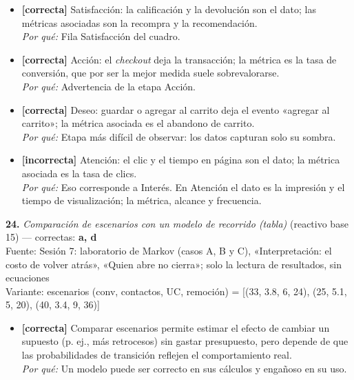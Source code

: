 \documentclass[10pt,letterpaper]{article}
\begin{document}
{\begin{itemize}[leftmargin=1.2em,itemsep=0pt,topsep=1pt,parsep=0pt]
\item[\textbf{a)}] {\footnotesize \textbf{[correcta]} Satisfacción: la calificación y la devolución son el dato; las métricas asociadas son la recompra y la recomendación.\\ \textit{Por qué:} Fila Satisfacción del cuadro.}
\item[\textbf{b)}] {\footnotesize \textbf{[correcta]} Acción: el \textit{checkout} deja la transacción; la métrica es la tasa de conversión, que por ser la mejor medida suele sobrevalorarse.\\ \textit{Por qué:} Advertencia de la etapa Acción.}
\item[\textbf{c)}] {\footnotesize \textbf{[correcta]} Deseo: guardar o agregar al carrito deja el evento «agregar al carrito»; la métrica asociada es el abandono de carrito.\\ \textit{Por qué:} Etapa más difícil de observar: los datos capturan solo su sombra.}
\item[\textbf{d)}] {\footnotesize \textbf{[incorrecta]} Atención: el clic y el tiempo en página son el dato; la métrica asociada es la tasa de clics.\\ \textit{Por qué:} Eso corresponde a Interés. En Atención el dato es la impresión y el tiempo de visualización; la métrica, alcance y frecuencia.}
\end{itemize}
\vspace{3pt}\noindent\textbf{24.} \textit{Comparación de escenarios con un modelo de recorrido (tabla)} (reactivo base 15) — correctas: \textbf{a, d}\\[-1pt]
{\scriptsize Fuente: Sesión 7: laboratorio de Markov (casos A, B y C), «Interpretación: el costo de volver atrás», «Quien abre no cierra»; solo la lectura de resultados, sin ecuaciones}
\\{\scriptsize Variante: escenarios (conv, contactos, UC, remoción) = [(33, 3.8, 6, 24), (25, 5.1, 5, 20), (40, 3.4, 9, 36)]}
\begin{itemize}[leftmargin=1.2em,itemsep=0pt,topsep=1pt,parsep=0pt]
\item[\textbf{a)}] {\footnotesize \textbf{[correcta]} Comparar escenarios permite estimar el efecto de cambiar un supuesto (p. ej., más retrocesos) sin gastar presupuesto, pero depende de que las probabilidades de transición reflejen el comportamiento real.\\ \textit{Por qué:} Un modelo puede ser correcto en sus cálculos y engañoso en su uso.}

\end{itemize}}
\end{document}
